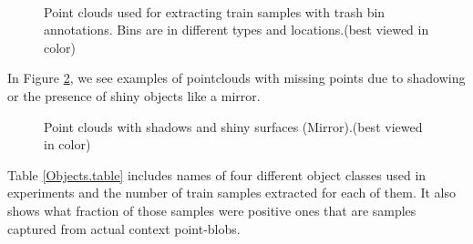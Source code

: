 \begin{figure} [htp]
     \begin{center}
    \\
    \end{center}
  \caption[Train set pointclouds]
  {Point clouds used for extracting train samples with trash bin annotations. Bins are in different types and locations.(best viewed in color)}
  \label{TrainClouds1.figure:edge}
\end{figure}

In Figure \ref{TrainClouds1Challenge.figure:edge}, we see examples of pointclouds with missing points due to shadowing or the presence of shiny objects like a mirror. 

\begin{figure} [htp]
    \begin{center}
   \end{center}
  \caption[Challenges with some pointclouds]
  {Point clouds with shadows and shiny surfaces (Mirror).(best viewed in color)}
  \label{TrainClouds1Challenge.figure:edge}
\end{figure}



Table \ref{Objects.table} includes names of four different object classes used in experiments and the number of train samples extracted for each of them.
It also shows what fraction of those samples were positive ones that are samples captured from actual context point-blobs.


